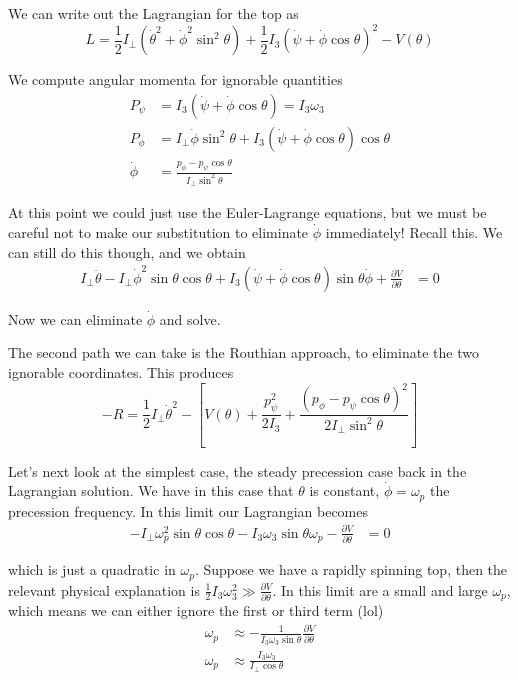\documentclass[10pt]{report}
\newcommand{\pd}[2]{\frac{\partial #1}{\partial#2}}
\begin{document}
We can write out the Lagrangian for the top as 
$$L = \frac{1}{2}I_\perp \left( \dot{\theta}^2 + \dot{\phi}^2\sin^2\theta \right) + \frac{1}{2}I_3\left( \dot{\psi} + \dot{\phi}\cos \theta \right)^2 - V(\theta)$$

We compute angular momenta for ignorable quantities
\begin{align*}
    P_\psi &= I_3\left( \dot{\psi} + \dot{\phi}\cos \theta \right) = I_3\omega_3\\
    P_\phi &= I_\perp \dot{\phi}\sin^2\theta + I_3\left( \dot{\psi}+\dot{\phi}\cos \theta \right)\cos \theta\\
    \dot{\phi} &= \frac{p_\phi - p_\psi\cos \theta}{I_{\perp}\sin^2\theta}
\end{align*}

At this point we could just use the Euler-Lagrange equations, but we must be careful not to make our substitution to eliminate $\dot{\phi}$ immediately! Recall this. We can still do this though, and we obtain
\begin{align*}
    I_\perp \ddot{\theta} - I_\perp\dot{\phi}^2 \sin \theta \cos \theta + I_3\left( \dot{\psi} + \dot{\phi}\cos \theta \right)\sin \theta \dot{\phi} + \pd{V}{\theta} &= 0
\end{align*}

Now we can eliminate $\dot{\phi}$ and solve.

The second path we can take is the Routhian approach, to eliminate the two ignorable coordinates. This produces
$$-R = \frac{1}{2}I_\perp \dot{\theta}^2 - \left[ V(\theta) + \frac{p_\psi^2}{2I_3} + \frac{(p_\phi - p_\psi\cos \theta)^2}{2I_\perp \sin^2\theta} \right]$$

Let's next look at the simplest case, the steady precession case back in the Lagrangian solution. We have in this case that $\theta$ is constant, $\dot{\phi} = \omega_p$ the precession frequency. In this limit our Lagrangian becomes
\begin{align*}
    - I_\perp\omega_p^2 \sin \theta \cos \theta - I_3\omega_3\sin \theta \omega_p - \pd{V}{\theta} &= 0
\end{align*}

which is just a quadratic in $\omega_p$. Suppose we have a rapidly spinning top, then the relevant physical explanation is $\frac{1}{2}I_3\omega_3^2 \gg \pd{V}{\theta}$. In this limit are a small and large $\omega_p$, which means we can either ignore the first or third term (lol)
\begin{align*}
    \omega_p &\approx -\frac{1}{I_3\omega_3\sin\theta}\pd{V}{\theta}\\
    \omega_p &\approx \frac{I_3\omega_3}{I_\perp \cos \theta}
\end{align*}
\end{document}
